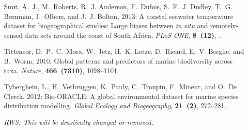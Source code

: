 \documentclass{ametsoc}
\begin{document}
\begin{thebibliography}{23}
Smit, A.~J., M.~Roberts, R.~J. Anderson, F.~Dufois, S.~F.~J. Dudley, T.~G.
  Bornman, J.~Olbers, and J.~J. Bolton, 2013: {A coastal seawater temperature
  dataset for biogeographical studies: Large biases between \textit{in situ} and
  remotely-sensed data sets around the coast of South Africa}. \textit{PLoS
  ONE}, \textbf{8~(12)}, .

Tittensor, D.~P., C.~Mora, W.~Jetz, H.~K. Lotze, D.~Ricard, E.~V. Berghe, and
  B.~Worm, 2010: {Global patterns and predictors of marine biodiversity across
  taxa}. \textit{Nature}, \textbf{466~(7310)}, 1098--1101.

Tyberghein, L., H.~Verbruggen, K.~Pauly, C.~Troupin, F.~Mineur, and O.~{De
  Clerck}, 2012: {Bio-ORACLE: A global environmental dataset for marine species
  distribution modelling}. \textit{Global Ecology and Biogeography},
  \textbf{21~(2)}, 272--281.


\end{thebibliography}

%
\emph{RWS: This will be drastically changed or removed.}
\end{document}
